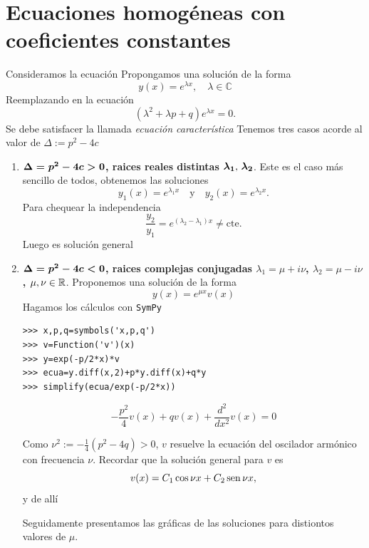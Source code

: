 \section{Ecuaciones homogéneas con coeficientes constantes}

Consideramos la ecuación
\label{2orden_coef_ctes}
Propongamos una solución de la forma
\[\boxed{y(x)=e^{\lambda x},\quad \lambda\in\mathbb{C}}\]
Reemplazando en la ecuación
\[(\lambda^2+\lambda p+q)e^{\lambda x}=0.\]
Se debe satisfacer la llamada \emph{ecuación característica}
Tenemos tres casos acorde al valor de $\Delta:=p^2-4c$

\begin{enumerate}

\item \noindent \textbf{ $\boldsymbol{\Delta=p^2-4c>0}$, raices reales distintas $\boldsymbol{\lambda_1$, $\lambda_2}$}. Este es el caso más sencillo de todos, obtenemos las soluciones
\[y_1(x)=e^{\lambda_1 x}\quad\text{y}\quad y_2(x)=e^{\lambda_2 x}.\]
Para chequear la independencia
\[\frac{y_2}{y_1}=e^{(\lambda_2-\lambda_1)x}\neq\text{cte}.\]
Luego
es solución general


\item \noindent  \textbf{$\boldsymbol{\Delta=p^2-4c<0}$, raices complejas conjugadas $\lambda_1=\mu+i\nu$, $\lambda_2=\mu-i\nu$, $\mu,\nu\in\mathbb{R}$}.
Proponemos una solución de la forma
\[
y(x)=e^{\mu x}v(x)
\]
Hagamos los cálculos con \texttt{SymPy}





\begin{lstlisting}
>>> x,p,q=symbols('x,p,q')
>>> v=Function('v')(x)
>>> y=exp(-p/2*x)*v
>>> ecua=y.diff(x,2)+p*y.diff(x)+q*y
>>> simplify(ecua/exp(-p/2*x))

\end{lstlisting}

\[-\frac{p^{2}}{4} v{\left (x \right )} + q v{\left (x \right )} + \frac{d^{2}}{d x^{2}}  v{\left (x \right )}=0
 \]

Como $\nu^2:=-\frac{1}{4}(p^2-4q)>0$, $v$ resuelve  la ecuación del oscilador armónico con frecuencia $\nu$. Recordar que la solución general
para $v$ es
\[v(x)=C_1\cos \nu x +C_2\operatorname{sen} \nu x,\]
y de allí

Seguidamente presentamos las gráficas de las soluciones para distiontos valores de $\mu$.


\end{enumerate}
